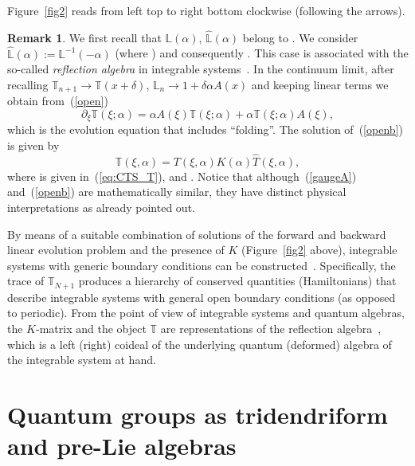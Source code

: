 \documentclass[10pt,a4paper]{amsart}
\numberwithin{equation}{section}
\theoremstyle{definition}
\newtheorem{rem}[thm]{Remark}
\DeclareMathOperator{\EEnd}{End}%
\def\mathfrak#1{#1}%
\def\mathcal#1{#1}%
\begin{document}
Figure~\ref{fig2} reads from left top to right bottom clockwise (following the arrows).

\begin{rem}%
We first recall that
${\mathbb L}(\alpha)$, $\hat {\mathbb L}(\alpha)$ belong to \smash{$\EEnd\bigl({\mathbb C}^{\mathcal N}\bigr) \otimes {\mathfrak A}$}. We consider $\hat {\mathbb L}(\alpha) := {\mathbb L}^{-1}(-\alpha)$
\big(where \smash{${\mathbb L}(\alpha) {\mathbb L}^{-1}(\alpha) = 1_{{\mathbb C}_{\mathcal N}} \otimes 1_{\mathfrak A}$}\big) and consequently . This case is associated with the so-called {\it reflection algebra} in integrable systems~\cite{Cherednik, Sklyaninb}.
In the continuum limit, after recalling ${\mathbb T}_{n+1} \to {\mathbb T}(x + \delta)$, ${\mathbb L}_n \to 1 + \delta\alpha A(x)$ and keeping linear terms we obtain from~(\ref{open})
\begin{equation}
\partial_{\xi}{\mathbb T}(\xi; \alpha) = \alpha A(\xi){ \mathbb T}(\xi; \alpha) + \alpha { \mathbb T}(\xi; \alpha) A(\xi), \label{openb}
\end{equation}
which is the evolution equation that includes ``folding''. The solution of~(\ref{openb}) is given by
\[
{\mathbb T}(\xi, \alpha) = T(\xi, \alpha) K(\alpha) \hat T(\xi, \alpha),
\]
 where \smash{$T(\xi, \alpha) = {\rm e}^{{\mathcal Q}(\xi, \alpha)}$} is given in~(\ref{eq:CTS_T}), and .
 Notice that although~(\ref{gaugeA}) and~(\ref{openb}) are mathematically similar, they have distinct physical interpretations as already pointed out.
\end{rem}

By means of a suitable combination of solutions of the forward and backward linear evolution problem and the presence of $K$ (Figure~\ref{fig2} above), integrable systems with generic boundary conditions can be constructed~\cite{Sklyanin, Sklyaninb}. Specifically, the trace of ${\mathbb T}_{N+1}$ produces a hierarchy of conserved quantities (Hamiltonians) that describe integrable systems with general open boundary conditions (as opposed to periodic). From the point of view of integrable systems and quantum algebras, the $K$-matrix and the object ${\mathbb T}$ are representations of the reflection algebra~\cite{Cherednik, Sklyanin, Sklyaninb}, which is a left (right) coideal of the underlying quantum (deformed) algebra of the integrable system at hand.

\section{Quantum groups as tridendriform and pre-Lie algebras}\label{section4}
\end{document}
